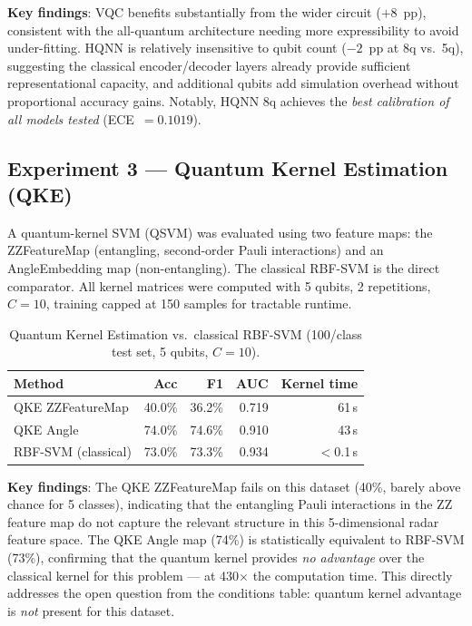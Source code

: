\documentclass[journal]{IEEEtran}
\begin{document}
\noindent\textbf{Key findings}: VQC benefits substantially from the wider circuit
($+8$~pp), consistent with the all-quantum architecture needing more
expressibility to avoid under-fitting. HQNN is relatively insensitive to qubit
count ($-2$~pp at 8q vs.\ 5q), suggesting the classical encoder/decoder layers
already provide sufficient representational capacity, and additional qubits add
simulation overhead without proportional accuracy gains. Notably, HQNN 8q
achieves the \emph{best calibration of all models tested} (ECE~$= 0.1019$).

\subsection{Experiment 3 — Quantum Kernel Estimation (QKE)}

A quantum-kernel SVM (QSVM) was evaluated using two feature maps: the
ZZFeatureMap (entangling, second-order Pauli interactions) and an AngleEmbedding
map (non-entangling). The classical RBF-SVM is the direct comparator.
All kernel matrices were computed with 5 qubits, 2 repetitions, $C = 10$,
training capped at 150 samples for tractable runtime.

\begin{table}[H]
\centering
\caption{Quantum Kernel Estimation vs.\ classical RBF-SVM
         (100/class test set, 5 qubits, $C = 10$).}
\begin{tabular}{lrrrr}
\toprule
\textbf{Method} & \textbf{Acc} & \textbf{F1} & \textbf{AUC} & \textbf{Kernel time} \\
\midrule
QKE ZZFeatureMap & 40.0\% & 36.2\% & 0.719 & 61\,s \\
QKE Angle        & 74.0\% & 74.6\% & 0.910 & 43\,s \\
RBF-SVM (classical) & 73.0\% & 73.3\% & 0.934 & $<$0.1\,s \\
\bottomrule
\end{tabular}
\end{table}

\noindent\textbf{Key findings}: The QKE ZZFeatureMap fails on this dataset (40\%,
barely above chance for 5 classes), indicating that the entangling Pauli
interactions in the ZZ feature map do not capture the relevant structure
in this 5-dimensional radar feature space. The QKE Angle map (74\%) is
statistically equivalent to RBF-SVM (73\%), confirming that the quantum
kernel provides \emph{no advantage} over the classical kernel for this problem
— at 430$\times$ the computation time. This directly addresses the open
question from the conditions table: quantum kernel advantage is \emph{not}
present for this dataset.
\end{document}
